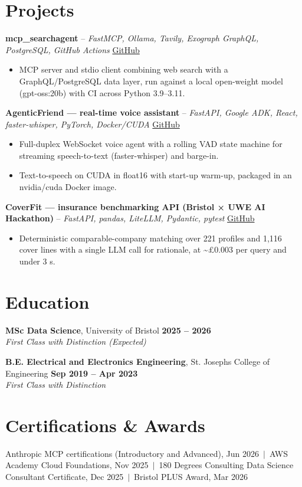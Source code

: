 \documentclass[a4paper,11pt]{article}
\begin{document}
\section{Projects}
\noindent\textbf{mcp\_searchagent} -- \textit{FastMCP, Ollama, Tavily, Exograph GraphQL, PostgreSQL, GitHub Actions} \hfill \href{https://github.com/Thiruvel-AP/mcp_searchagent}{GitHub}
\begin{itemize}
  \item MCP server and stdio client combining web search with a GraphQL/PostgreSQL data layer, run against a local open-weight model (gpt-oss:20b) with CI across Python 3.9–3.11.
\end{itemize}
\vspace{3pt}
\noindent\textbf{AgenticFriend — real-time voice assistant} -- \textit{FastAPI, Google ADK, React, faster-whisper, PyTorch, Docker/CUDA} \hfill \href{https://github.com/Thiruvel-AP/adk_multi-agent}{GitHub}
\begin{itemize}
  \item Full-duplex WebSocket voice agent with a rolling VAD state machine for streaming speech-to-text (faster-whisper) and barge-in.
  \item Text-to-speech on CUDA in float16 with start-up warm-up, packaged in an nvidia/cuda Docker image.
\end{itemize}
\vspace{3pt}
\noindent\textbf{CoverFit — insurance benchmarking API (Bristol × UWE AI Hackathon)} -- \textit{FastAPI, pandas, LiteLLM, Pydantic, pytest} \hfill \href{https://github.com/Thiruvel-AP/AIHackathon-Phoenix}{GitHub}
\begin{itemize}
  \item Deterministic comparable-company matching over 221 profiles and 1,116 cover lines with a single LLM call for rationale, at \textasciitilde{}£0.003 per query and under 3 s.
\end{itemize}

\section{Education}
\textbf{MSc Data Science}, University of Bristol \hfill \textbf{2025 – 2026}\\ \textit{First Class with Distinction (Expected)}\par
\vspace{3pt}
\textbf{B.E. Electrical and Electronics Engineering}, St. Joseph\textquotesingle{}s College of Engineering \hfill \textbf{Sep 2019 – Apr 2023}\\ \textit{First Class with Distinction}\par

\section{Certifications \& Awards}
Anthropic MCP certifications (Introductory and Advanced), Jun 2026 \,$|$\, AWS Academy Cloud Foundations, Nov 2025 \,$|$\, 180 Degrees Consulting Data Science Consultant Certificate, Dec 2025 \,$|$\, Bristol PLUS Award, Mar 2026
\end{document}
